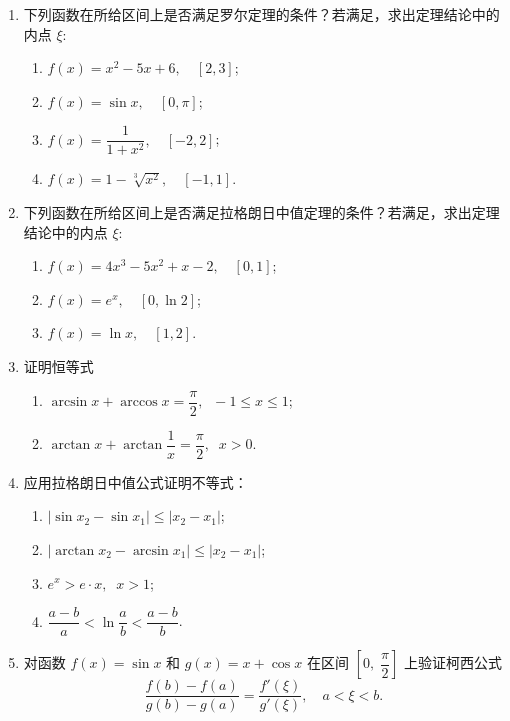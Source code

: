 \begin{enumerate}\setlength{\itemsep}{7pt}
    \item 下列函数在所给区间上是否满足罗尔定理的条件？若满足，求出定理结论中的内点 $\xi$:
    \begin{enumerate}[(1)]\setlength{\itemsep}{5pt}\setlength{\topsep}{15pt}
        \item $f(x)=x^2-5x+6,\quad[2,3]$;
        \item $f(x)=\sin x,\quad[0,\pi]$;
        \item $f(x)=\dfrac{1}{1+x^2},\quad[-2,2]$;
        \item $f(x)=1-\sqrt[3]{x^2},\quad[-1,1]$.
    \end{enumerate}

    \item 下列函数在所给区间上是否满足拉格朗日中值定理的条件？若满足，求出定理结论中的内点 $\xi$:
    \begin{enumerate}[(1)]\setlength{\itemsep}{5pt}\setlength{\topsep}{15pt}
        \item $f(x)=4x^3-5x^2+x-2,\quad[0,1]$;
        \item $f(x)=e^x,\quad[0,\ln2]$;
        \item $f(x)=\ln x,\quad[1,2]$.
    \end{enumerate}

    \item 证明恒等式
    \begin{enumerate}[(1)]\setlength{\itemsep}{5pt}\setlength{\topsep}{15pt}
        \item $\arcsin x+\arccos x=\dfrac{\pi}{2},\;\;-1\leqslant x\leqslant 1$;
        \item $\arctan x+\arctan\dfrac{1}{x}=\dfrac{\pi}{2},\;\;x>0$.
    \end{enumerate}

    \item 应用拉格朗日中值公式证明不等式：
    \begin{enumerate}[(1)]\setlength{\itemsep}{5pt}\setlength{\topsep}{15pt}
        \item $|\sin x_2-\sin x_1|\leqslant |x_2-x_1|$;
        \item $|\arctan x_2-\arcsin x_1|\leqslant |x_2-x_1|$;
        \item $e^x>e\cdot x,\;\;x>1$;
        \item $\dfrac{a-b}{a}<\ln\dfrac{a}{b}<\dfrac{a-b}{b}$.
    \end{enumerate}
    
    \item 对函数 $f(x)=\sin x$ 和 $g(x)=x+\cos x$ 在区间 $\left[0,\;\dfrac{\pi}{2}\right]$ 上验证柯西公式
    \[
        \dfrac{f(b)-f(a)}{g(b)-g(a)}=\dfrac{f'(\xi)}{g'(\xi)},\quad a<\xi<b.
    \]


\end{enumerate}
